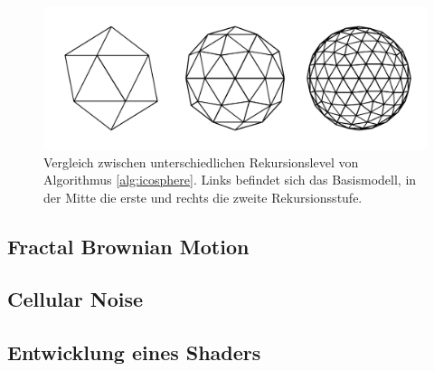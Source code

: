 \begin{figure}
  \includegraphics[width=\columnwidth]{icosphere-algorithm}
  \caption{Vergleich zwischen unterschiedlichen Rekursionslevel von Algorithmus \ref{alg:icosphere}. Links befindet sich das Basismodell, in der Mitte die erste und rechts die zweite Rekursionsstufe.}
  \label{fig:icosphere-levels}
  \Description[]{}
\end{figure}

\subsection{Fractal Brownian Motion}
\subsection{Cellular Noise}
\subsection{Entwicklung eines Shaders}
